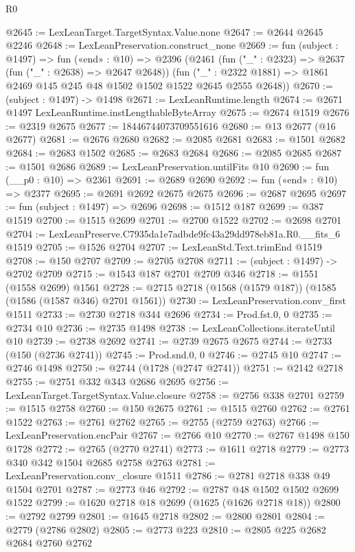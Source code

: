 \begin{lexlean}{R0}
\begin{coremodule}
@2645 := LexLeanTarget.TargetSyntax.Value.none
@2647 := @2644 @2645 @2246
@2648 := LexLeanPreservation.construct_none
@2669 := fun (subject : @1497) =>
  fun («end» : @10) =>
  @2396
    (@2461
      (fun ("_" : @2323) => @2637 (fun ("_" : @2638) => @2647 @2648))
      (fun ("_" : @2322 @1881) => @1861 @2469 @145 @245 @48 @1502 @1502 @1522 @2645 @2555 @2648))
@2670 := (subject : @1497) -> @1498
@2671 := LexLeanRuntime.length
@2674 := @2671 @1497 LexLeanRuntime.instLengthableByteArray
@2675 := @2674 @1519
@2676 := @2319 @2675
@2677 := 18446744073709551616
@2680 := @13 @2677 (@16 @2677)
@2681 := @2676 @2680
@2682 := @2085 @2681
@2683 := @1501 @2682
@2684 := @2683 @1502
@2685 := @2683 @2684
@2686 := @2085 @2685
@2687 := @1501 @2686
@2689 := LexLeanPreservation.untilFits @10
@2690 := fun (__p0 : @10) => @2361
@2691 := @2689 @2690
@2692 := fun («end» : @10) => @2377
@2695 := @2691 @2692 @2675 @2675
@2696 := @2687 @2695
@2697 := fun (subject : @1497) => @2696
@2698 := @1512 @187
@2699 := @387 @1519
@2700 := @1515 @2699
@2701 := @2700 @1522
@2702 := @2698 @2701
@2704 := LexLeanPreserve.C7935da1e7adbde9fc43a29dd978eb81a.R0.__fits_6 @1519
@2705 := @1526 @2704
@2707 := LexLeanStd.Text.trimEnd @1519
@2708 := @150 @2707
@2709 := @2705 @2708
@2711 := (subject : @1497) -> @2702 @2709
@2715 := @1543 @187 @2701 @2709 @346
@2718 := @1551 (@1558 @2699) @1561
@2728 := @2715 @2718 (@1568 (@1579 @187)) (@1585 (@1586 (@1587 @346) @2701 @1561))
@2730 := LexLeanPreservation.conv_first @1511
@2733 := @2730 @2718 @344 @2696
@2734 := Prod.fst.{0, 0}
@2735 := @2734 @10
@2736 := @2735 @1498
@2738 := LexLeanCollections.iterateUntil @10
@2739 := @2738 @2692
@2741 := @2739 @2675 @2675
@2744 := @2733 (@150 (@2736 @2741))
@2745 := Prod.snd.{0, 0}
@2746 := @2745 @10
@2747 := @2746 @1498
@2750 := @2744 (@1728 (@2747 @2741))
@2751 := @2142 @2718
@2755 := @2751 @332 @343 @2686 @2695
@2756 := LexLeanTarget.TargetSyntax.Value.closure
@2758 := @2756 @338 @2701
@2759 := @1515 @2758
@2760 := @150 @2675
@2761 := @1515 @2760
@2762 := @2761 @1522
@2763 := @2761 @2762
@2765 := @2755 (@2759 @2763)
@2766 := LexLeanPreservation.encPair
@2767 := @2766 @10
@2770 := @2767 @1498 @150 @1728
@2772 := @2765 (@2770 @2741)
@2773 := @1611 @2718
@2779 := @2773 @340 @342 @1504 @2685 @2758 @2763
@2781 := LexLeanPreservation.conv_closure @1511
@2786 := @2781 @2718 @338 @49 @1504 @2701
@2787 := @2773 @46
@2792 := @2787 @48 @1502 @1502 @2699 @1522
@2799 := @1620 @2718 @18 @2699 (@1625 (@1626 @2718 @18))
@2800 := @2792 @2799
@2801 := @1645 @2718
@2802 := @2800 @2801
@2804 := @2779 (@2786 @2802)
@2805 := @2773 @223
@2810 := @2805 @225 @2682 @2684 @2760 @2762

\end{coremodule}
\end{lexlean}
